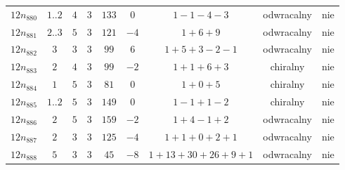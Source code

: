\begin{longtable}{ccccccccc}
$12n_{880}$ & $1..2$ & $4$ & $3$ & $133$ & $0$ & $1-1-4-3$ & odwracalny & nie \\
$12n_{881}$ & $2..3$ & $5$ & $3$ & $121$ & $-4$ & $1+6+9$ & odwracalny & nie \\
$12n_{882}$ & $3$ & $3$ & $3$ & $99$ & $6$ & $1+5+3-2-1$ & odwracalny & nie \\
$12n_{883}$ & $2$ & $4$ & $3$ & $99$ & $-2$ & $1+1+6+3$ & chiralny & nie \\
$12n_{884}$ & $1$ & $5$ & $3$ & $81$ & $0$ & $1+0+5$ & chiralny & nie \\
$12n_{885}$ & $1..2$ & $5$ & $3$ & $149$ & $0$ & $1-1+1-2$ & chiralny & nie \\
$12n_{886}$ & $2$ & $5$ & $3$ & $159$ & $-2$ & $1+4-1+2$ & odwracalny & nie \\
$12n_{887}$ & $2$ & $3$ & $3$ & $125$ & $-4$ & $1+1+0+2+1$ & odwracalny & nie \\
$12n_{888}$ & $5$ & $3$ & $3$ & $45$ & $-8$ & $1+13+30+26+9+1$ & odwracalny & nie \\
\hline
\end{longtable}
\normalsize

